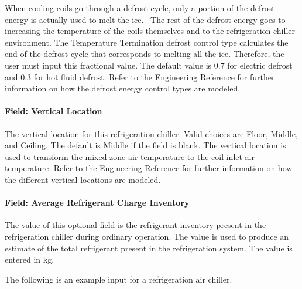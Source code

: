 When cooling coils go through a defrost cycle, only a portion of the defrost energy is actually used to melt the ice.~ The rest of the defrost energy goes to increasing the temperature of the coils themselves and to the refrigeration chiller environment. The Temperature Termination defrost control type calculates the end of the defrost cycle that corresponds to melting all the ice. Therefore, the user must input this fractional value. The default value is 0.7 for electric defrost and 0.3 for hot fluid defrost. Refer to the Engineering Reference for further information on how the defrost energy control types are modeled.

\paragraph{Field: Vertical Location}\label{field-vertical-location}

The vertical location for this refrigeration chiller. Valid choices are Floor, Middle, and Ceiling. The default is Middle if the field is blank. The vertical location is used to transform the mixed zone air temperature to the coil inlet air temperature. Refer to the Engineering Reference for further information on how the different vertical locations are modeled.

\paragraph{Field: Average Refrigerant Charge Inventory}\label{field-average-refrigerant-charge-inventory-2}

The value of this optional field is the refrigerant inventory present in the refrigeration chiller during ordinary operation. The value is used to produce an estimate of the total refrigerant present in the refrigeration system. The value is entered in kg.

The following is an example input for a refrigeration air chiller.


